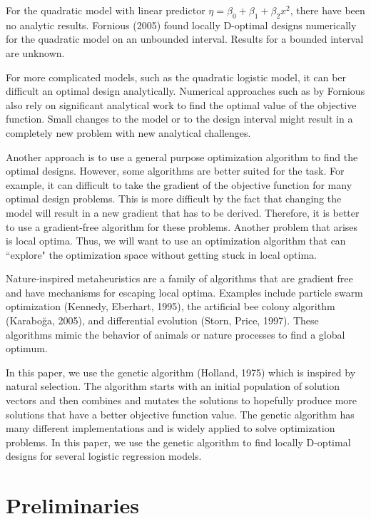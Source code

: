 \documentclass[11pt,a4paper]{article}
\begin{document}
For the quadratic model with linear predictor $\eta = \beta_0 + \beta_1 + \beta_2x^2$, there have been no analytic results. Fornious (2005) found locally D-optimal designs numerically for the quadratic model on an unbounded interval. Results for a bounded interval are unknown.

For more complicated models, such as the quadratic logistic model, it can ber difficult an optimal design analytically. Numerical approaches such as by Fornious also rely on significant analytical work to find the optimal value of the objective function. Small changes to the model or to the design interval might result in a completely new problem with new analytical challenges.

Another approach is to use a general purpose optimization algorithm to find the optimal designs. However, some algorithms are better suited for the task. For example, it can difficult to take the gradient of the objective function for many optimal design problems. This is more difficult by the fact that changing the model will result in a new gradient that has to be derived. Therefore, it is better to use a gradient-free algorithm for these problems. Another problem that arises is local optima. Thus, we will want to use an optimization algorithm that can ``explore" the optimization space without getting stuck in local optima.

Nature-inspired metaheuristics are a family of algorithms that are gradient free and have mechanisms for escaping local optima. Examples include particle swarm optimization (Kennedy, Eberhart,  1995), the artificial bee colony algorithm (Karaboğa, 2005), and differential evolution (Storn, Price, 1997). These algorithms mimic the behavior of animals or nature processes to find a global optimum. 

In this paper, we use the genetic algorithm (Holland, 1975) which is inspired by natural selection. The algorithm starts with an initial population of solution vectors and then combines and mutates the solutions to hopefully produce more solutions that have a better objective function value. The genetic algorithm has many different implementations and is widely applied to solve optimization problems. In this paper, we use the genetic algorithm to find locally D-optimal designs for several logistic regression models.






\section{Preliminaries}
\end{document}
